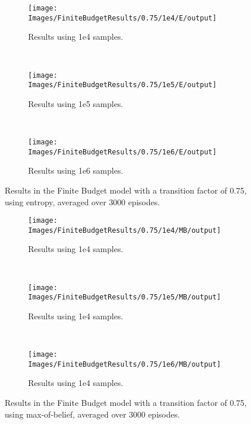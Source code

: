 \begin{figure}[ht]
        \centering
        \begin{subfigure}[t]{0.3\textwidth}
                \texttt{[image: Images/FiniteBudgetResults/0.75/1e4/E/output]}
                \caption{Results using 1e4 samples.}
                \label{fig:fb4e75}
        \end{subfigure}%
        ~ %
        \begin{subfigure}[t]{0.3\textwidth}
                \texttt{[image: Images/FiniteBudgetResults/0.75/1e5/E/output]}
                \caption{Results using 1e5 samples.}
                \label{fig:fb5e75}
        \end{subfigure}
        ~ %
        \begin{subfigure}[t]{0.3\textwidth}
                \texttt{[image: Images/FiniteBudgetResults/0.75/1e6/E/output]}
                \caption{Results using 1e6 samples.}
                \label{fig:fb6e75}
        \end{subfigure}
        \caption{Results in the Finite Budget model with a transition factor of 0.75, using entropy, averaged over 3000 episodes.}
        \label{ref:fbentropyfig75}
\end{figure}

\begin{figure}[ht]
        \centering
        \begin{subfigure}[t]{0.3\textwidth}
                \texttt{[image: Images/FiniteBudgetResults/0.75/1e4/MB/output]}
                \caption{Results using 1e4 samples.}
                \label{fig:fb4m75}
        \end{subfigure}%
        ~ %
        \begin{subfigure}[t]{0.3\textwidth}
                \texttt{[image: Images/FiniteBudgetResults/0.75/1e5/MB/output]}
                \caption{Results using 1e4 samples.}
                \label{fig:fb5m75}
        \end{subfigure}
        ~ %
        \begin{subfigure}[t]{0.3\textwidth}
                \texttt{[image: Images/FiniteBudgetResults/0.75/1e6/MB/output]}
                \caption{Results using 1e4 samples.}
                \label{fig:fb6m75}
        \end{subfigure}
        \caption{Results in the Finite Budget model with a transition factor of 0.75, using max-of-belief, averaged over 3000 episodes.}
        \label{ref:fbmbfig75}
\end{figure}

